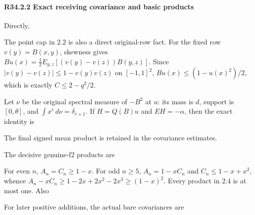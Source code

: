 \paragraph{R34.2.2 Exact receiving covariance and basic products}

Directly,


The point cap in \(2.2\) is also a direct original-row fact. For the fixed
row \(v(y)=B(x,\allowbreak  y)\), skewness gives
\(Bu(x)=\tfrac12E_{y,\allowbreak  z}[(v(y)-v(z))B(y,\allowbreak  z)]\).
Since \(|v(y)-v(z)|\le1-v(y)v(z)\) on \([-1,\allowbreak  1]^2\),
\(Bu(x)\le(1-u(x)^2)/2\), which is exactly \(C\le2-q^2/2\).

Let \(\nu\) be the original spectral measure of \(-B^2\) at \(u\):
its mass is \(d\), support is \([0,\allowbreak  \theta]\), and
\(\int x^r\,\allowbreak  d\nu=\delta_{r+1}\). If \(H=Q(B)u\) and \(EH=-\alpha\),
then the exact identity is


The final signed mean product is retained in the covariance estimates.

The decisive genuine-f2 products are


For even \(n\), \(A_n=C_n\ge1-x\). For odd \(n\ge5\),
\(A_n=1-xC_n\) and \(C_n\le1-x+x^2\), whence
\(A_n-xC_n\ge1-2x+2x^2-2x^3\ge(1-x)^2\).
Every product in \(2.4\) is at most one. Also


For later positive additions, the actual bare covariances are


